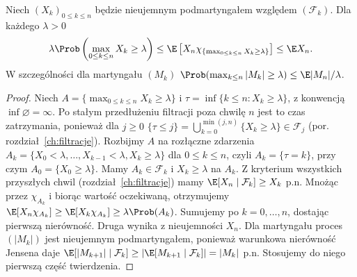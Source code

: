 \begin{twierdzenie}
Niech $(X_k)_{0\leq k\leq n}$ będzie nieujemnym
podmartyngałem względem $(\mathcal F_k)$.
Dla każdego $\lambda>0$
\[
\lambda\Prob\left(\max_{0\leq k\leq n}X_k\geq\lambda\right)
\leq\E\left[X_n\chi_{\{\max_{0\leq k\leq n}X_k\geq\lambda\}}\right]
\leq\E X_n.
\]
W szczególności dla martyngału $(M_k)$
$\Prob(\max_{k\leq n}|M_k|\geq\lambda)
\leq\E|M_n|/\lambda$.
\end{twierdzenie}
\begin{proof}
Niech $A=\{\max_{0\leq k\leq n}X_k\geq\lambda\}$
i $\tau=\inf\{k\leq n:X_k\geq\lambda\}$,
z konwencją $\inf\varnothing=\infty$.
Po stałym przedłużeniu filtracji poza chwilę $n$
jest to czas zatrzymania, ponieważ dla $j\geq0$
$\{\tau\leq j\}=\bigcup_{k=0}^{\min(j,n)}
\{X_k\geq\lambda\}\in\mathcal F_j$
(por. rozdział~\ref{ch:filtracje}).
Rozbijmy $A$ na rozłączne zdarzenia
$A_k=\{X_0<\lambda,\ldots,X_{k-1}<\lambda,
X_k\geq\lambda\}$ dla $0\leq k\leq n$,
czyli $A_k=\{\tau=k\}$, przy czym
$A_0=\{X_0\geq\lambda\}$.
Mamy $A_k\in\mathcal F_k$ i
$X_k\geq\lambda$ na $A_k$.
Z kryterium wszystkich przyszłych chwil
(rozdział~\ref{ch:filtracje}) mamy
$\E[X_n\mid\mathcal F_k]\geq X_k$ p.n.
Mnożąc przez $\chi_{A_k}$ i biorąc wartość
oczekiwaną, otrzymujemy
$\E[X_n\chi_{A_k}]\geq\E[X_k\chi_{A_k}]
\geq\lambda\Prob(A_k)$.
Sumujemy po $k=0,\ldots,n$, dostając pierwszą
nierówność. Druga wynika z nieujemności $X_n$.
Dla martyngału proces $(|M_k|)$ jest nieujemnym
podmartyngałem, ponieważ warunkowa nierówność
Jensena daje
$\E[|M_{k+1}|\mid\mathcal F_k]\geq
|\E[M_{k+1}\mid\mathcal F_k]|=|M_k|$ p.n.
Stosujemy do niego pierwszą część twierdzenia.
\end{proof}

